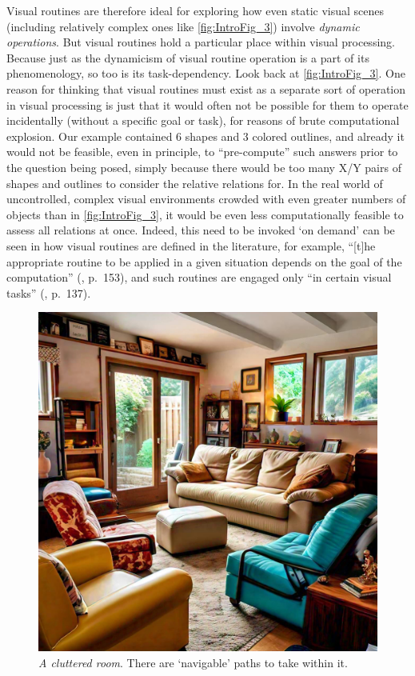 Visual routines are therefore ideal for exploring how even static visual scenes (including relatively complex ones like \cref{fig:IntroFig_3}) involve \textit{dynamic operations}.  But visual routines hold a particular place within visual processing.  Because just as the dynamicism of visual routine operation is a part of its phenomenology, so too is its task-dependency.  Look back at \cref{fig:IntroFig_3}.  One reason for thinking that visual routines must exist as a separate sort of operation in visual processing is just that it would often not be possible for them to operate incidentally (without a specific goal or task), for reasons of brute computational explosion.  Our example contained 6 shapes and 3 colored outlines, and already it would not be feasible, even in principle, to “pre-compute” such answers prior to the question being posed, simply because there would be too many X/Y pairs of shapes and outlines to consider the relative relations for.  In the real world of uncontrolled, complex visual environments crowded with even greater numbers of objects than in \cref{fig:IntroFig_3}, it would be even less computationally feasible to assess all relations at once.  Indeed, this need to be invoked ‘on demand’ can be seen in how visual routines are defined in the literature, for example, “[t]he appropriate routine to be applied in a given situation depends on the goal of the computation” (\cite{ullman_visual_1984}, p.~153), and such routines are engaged only “in certain visual tasks” (\cite{jolicoeur_curve_1986}, p.~137). 

\begin{figure}
    \centering
    \includegraphics[width=\textwidth]{figures/IntroFig/clutteredroom.jpg}
    \caption
    {\textit{A cluttered room}. There are ‘navigable’ paths to take within it.}
    \label{fig:IntroFig_4}
\end{figure}

